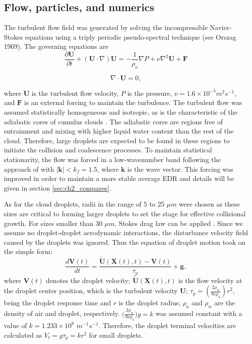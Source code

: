\subsection{Flow, particles, and numerics}\label{sec:ch2_common}

The turbulent flow field was generated by solving the incompressible Navier-Stokes equations using a triply periodic pseudo-spectral technique (see Orszag 1969). The governing equations are 
\begin{equation} \label{eqn:NS1}
\frac{\partial \mathbf{U}}{\partial t}+(\mathbf{U}\cdot\nabla) \mathbf{U} = -\frac{1}{\rho_a}\nabla P+\nu \nabla^2\mathbf{U}+\mathbf{F}
\end{equation}

\begin{equation} \label{eqn:NS2}
\nabla\cdot\mathbf{U}=0, 
\end{equation}

where $\mathbf{U}$ is the turbulent flow velocity, $P$ is the pressure, $\nu = 1.6 \times 10^{-5} m^2 s^{-1}$, and $\mathbf{F}$ is an external forcing to maintain the turbulence. The turbulent flow was assumed statistically homogeneous and isotropic, as is the characteristic of the adiabatic cores of cumulus clouds \citep{Vaillancourt2000}. The adiabatic cores are regions free of entrainment and mixing with higher liquid water content than the rest of the cloud. Therefore, large droplets are expected to be found in these regions to initiate the collision and coalescence processes. To maintain statistical stationarity, the flow was forced in a low-wavenumber band following the approach of \citet{Sullivan1994} with $|\mathbf{k}|<k_f =1.5$, where $\mathbf{k}$ is the wave vector. This forcing was improved in order to maintain a more stable average EDR and details will be given in section \ref{sec:ch2_compares}.

As for the cloud droplets, radii in the range of 5 to 25 $\mu m$ were chosen as these sizes are critical to forming larger droplets to set the stage for effective collisional growth. For sizes smaller than 30 $\mu m$, Stokes drag law can be applied \citep{Pruppacher1997}. Since we assume no droplet-droplet aerodynamic interactions, the disturbance velocity field caused by the droplets was ignored. Thus the equation of droplet motion took on the simple form: 
\begin{equation} \label{eqn:dropmotion}
\frac{d\mathbf{V}(t)}{dt}=\frac{\tilde{\mathbf{U}}(\mathbf{X}(t),t)-\mathbf{V}(t)}{\tau_p}+\mathbf{g},
\end{equation}
where $\mathbf{V}(t)$ denotes the droplet velocity; $\tilde{\mathbf{U}}(\mathbf{X}(t),t)$ is the flow velocity at the droplet center position, which is the turbulent velocity $\mathbf{U}$; $\tau_p = (\frac{2\rho_w}{9\nu \rho_a}) r^2$, being the droplet response time and $r$ is the droplet radius; $\rho_a$ and $\rho_w$ are the density of air and droplet, respectively. $\big(\frac{2\rho_w}{9\nu \rho_a}\big) g=k$ was assumed constant with a value of $k=1.233 \times 10^8$ $m^{-1} s^{-1}$. Therefore, the droplet terminal velocities are calculated as $V_t = g \tau_p = k r^2$ for small droplets. 


